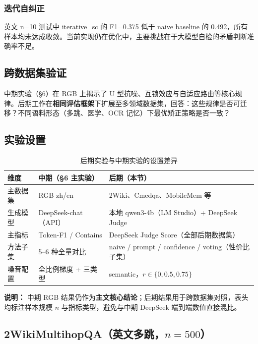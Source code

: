 \documentclass[UTF8,zihao=-4]{ctexart}
\begin{document}
\subsubsection{迭代自纠正}

英文 n=10 测试中 iterative\_sc 的 F1=0.375 低于 naive baseline 的 0.492，所有样本均未达成收敛。当前实现仍在优化中，主要挑战在于大模型自检的矛盾判断准确率不足。

\subsection{跨数据集验证}

中期实验（§6）在 RGB 上揭示了 U 型抗噪、互锁效应与自适应路由等核心规律。后期工作在\textbf{相同评估框架}下扩展至多领域数据集，回答：这些规律是否可迁移？不同语料形态（多跳、医学、OCR 记忆）下最优矫正策略是否一致？

\subsection{实验设置}

\begin{table}[H]
  \centering
  \caption{后期实验与中期实验的设置差异}
  \begin{tabularx}{\textwidth}{lYY}
    \toprule
    维度 & 中期（§6 主实验） & 后期（本节） \\
    \midrule
    主数据集 & RGB zh/en & 2Wiki、Cmedqa、MobileMem 等 \\
    生成模型 & DeepSeek-chat（API） & 本地 qwen3-4b（LM Studio）+ DeepSeek Judge \\
    主指标 & Token-F1 / Contains & DeepSeek Judge Score（全部后期数据集） \\
    方法子集 & 5--6 种全量对比 & naive / prompt / confidence / voting（性价比子集） \\
    噪音配置 & 全比例梯度 + 三类型 & semantic，$r \in \{0, 0.5, 0.75\}$ \\
    \bottomrule
  \end{tabularx}
\end{table}

\textbf{说明：} 中期 RGB 结果仍作为\textbf{主文核心结论}；后期结果用于跨数据集对照，表头均标注样本规模 $n$ 与指标类型，避免与中期 DeepSeek 端到端数值直接混比。

\subsection{2WikiMultihopQA（英文多跳，$n=500$）}
\end{document}
